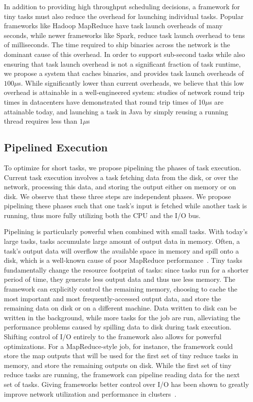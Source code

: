 In addition to providing high throughput scheduling decisions, a framework for
tiny tasks must also reduce the overhead
for launching individual tasks. Popular frameworks like Hadoop MapReduce
have task launch overheads of many seconds, while newer frameworks like Spark,
reduce task launch overhead to tens of milliseconds. The time required to 
ship binaries across the network is the dominant cause of this overhead.
In order to support sub-second tasks while also ensuring that
task launch overhead is not a significant fraction of task runtime, we propose a system
that caches binaries, and provides task launch overheads of $100 \mu$s. While significantly
lower than current overheads, we believe that this low
overhead is attainable in a well-engineered system:
studies of network round
trip times in datacenters have demonstrated that round trip times of 10$\mu$s
are attainable today, and launching a task in Java by simply
reusing a running thread requires less than $1\mu$s

\subsection{Pipelined Execution}
\label{sec:pipeline}
To optimize for short tasks, we propose pipelining the phases of task execution.
Current task execution involves a task fetching data from the disk, or over the network,
processing this data, and storing the output either on memory or on disk. We observe
that these three steps are independent phases. We propose pipelining these phases such that one task's
input is fetched while another task is running, thus more fully utilizing both
the CPU and the I/O bus.

Pipelining is particularly powerful when combined with small tasks. With
today's large tasks, tasks accumulate large amount of output data in memory.
Often, a task's output data will overflow the available space in memory
and spill onto a disk, which is a well-known cause of poor MapReduce
performance~\cite{lipcon2012optimizing}. Tiny tasks fundamentally change the
resource footprint of tasks: since tasks run for a shorter period of time,
they generate less output data and thus use less memory. The framework can
explicitly control the remaining memory, choosing to cache the most important
and most frequently-accessed output data, and store the remaining data on disk
or on a different machine. Data written to disk can be written in the
background, while more tasks for the job are run, alleviating the performance
problems caused by spilling data to disk during task execution.
Shifting control of I/O entirely to the framework also allows for
powerful optimizations.  For a MapReduce-style job, for instance, the
framework could store the map outputs that will be used for the first set of
tiny reduce tasks in memory, and store the remaining outputs on disk. While
the first set of tiny reduce tasks are running, the framework can pipeline
reading data for the next set of tasks.  Giving frameworks better control over
I/O has been shown
to greatly improve network utilization and performance in
clusters~\cite{chowdhury2011managing, chowdhury2012coflow}.

